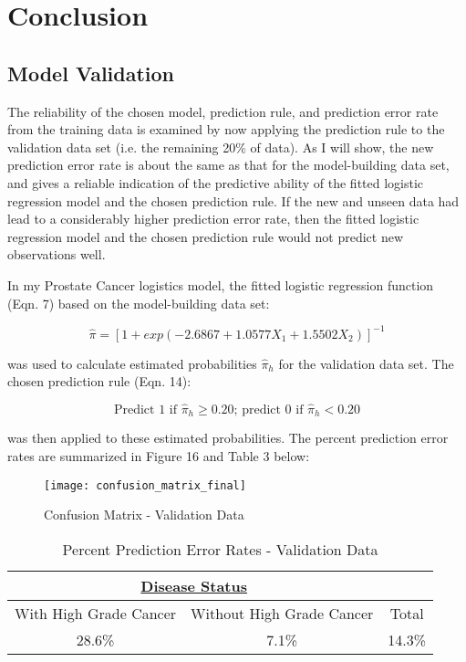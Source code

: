 %
%

\section{Conclusion}
\subsection{Model Validation}
The reliability of the chosen model, prediction rule, and prediction error rate from the training data is examined by now applying the prediction rule to the validation data set (i.e. the remaining 20\% of data). As I will show, the new prediction error rate is about the same as that for the model-building data set, and gives a reliable indication of the predictive ability of the fitted logistic regression model and the chosen prediction rule. If the new and unseen data had lead to a considerably higher prediction error rate, then the fitted logistic regression model and the chosen prediction rule would not predict new observations well. \par

\pagebreak
In my Prostate Cancer logistics model, the fitted logistic regression function (Eqn. 7) based on the model-building data set:

\[
\hat{\pi}=[ 1+ exp(-2.6867 + 1.0577X_1 + 1.5502X_2)]^{-1}
\]

was used to calculate estimated probabilities \(\hat{\pi}_h\) for the validation data set. The chosen prediction rule (Eqn. 14):

\[
	\textrm{Predict 1 if } \hat{\pi}_h \geq 0.20\textrm{; predict 0 if } \hat{\pi}_h < 0.20
\]

was then applied to these estimated probabilities. The percent prediction error rates are summarized in Figure 16 and Table 3 below:

\begin{figure}[H]
	\centering
	\texttt{[image: confusion\_matrix\_final]}
	\caption{Confusion Matrix - Validation Data}
\end{figure}

\begin{table}[H]
	\centering
	\begin{tabular}{ |c|c||c| }
 	\multicolumn{2}{c}{\underline{Disease Status}} \\
 	\hline
 	With High Grade Cancer&Without High Grade Cancer&Total\\
 	28.6\%&7.1\%&14.3\%\\
 	\hline
	\end{tabular}
 	\caption{Percent Prediction Error Rates - Validation Data}
\end{table}

